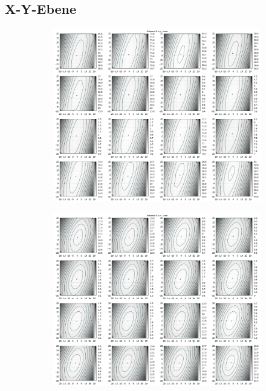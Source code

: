 \begin{appendix}
\section{X-Y-Ebene}
%
\newpage
\begin{figure}[!ht]
	\centering
	\begin{subfigure}[t]{0.3\textwidth}
	     \centering
	     \includegraphics[width=\textwidth]{img/fitness/xy/a0.png}
	\end{subfigure}
	\begin{subfigure}[t]{0.3\textwidth}
		\centering
	     \includegraphics[width=\textwidth]{img/fitness/xz/a0.png}

\end{subfigure}
\end{figure}
\end{appendix}
